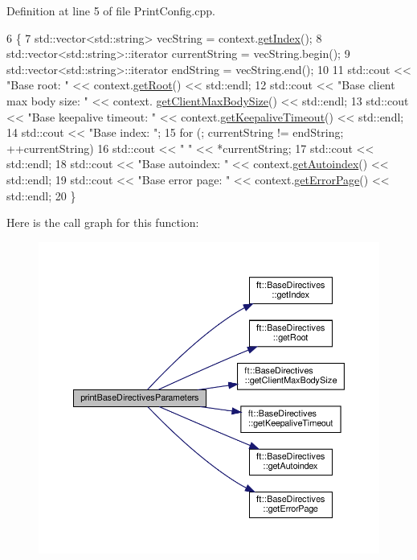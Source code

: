 Definition at line 5 of file Print\+Config.\+cpp.


\begin{DoxyCode}
6     \{
7         std::vector<std::string>        vecString = context.\hyperlink{classft_1_1_base_directives_a018f34a5ffd66e891494b5c0ee69177b}{getIndex}();
8         std::vector<std::string>::iterator  currentString = vecString.begin();
9         std::vector<std::string>::iterator      endString = vecString.end();
10 
11         std::cout << \textcolor{stringliteral}{"Base root: "} << context.\hyperlink{classft_1_1_base_directives_aa5dbcb08bda0a0e7e502d2df7cf64287}{getRoot}() << std::endl;
12         std::cout << \textcolor{stringliteral}{"Base client max body size: "} << context.
      \hyperlink{classft_1_1_base_directives_a930398ba1e4b99b2ba01a60dcda0c923}{getClientMaxBodySize}() << std::endl;
13         std::cout << \textcolor{stringliteral}{"Base keepalive timeout: "} << context.\hyperlink{classft_1_1_base_directives_ab8574338758f65325cab5d1c394826c8}{getKeepaliveTimeout}() << 
      std::endl;
14         std::cout << \textcolor{stringliteral}{"Base index: "};
15         \textcolor{keywordflow}{for} (; currentString != endString; ++currentString)
16             std::cout << \textcolor{stringliteral}{" "} << *currentString;
17         std::cout << std::endl;
18         std::cout << \textcolor{stringliteral}{"Base autoindex: "} << context.\hyperlink{classft_1_1_base_directives_a4c11ed7ad76aeac228b029a2444de568}{getAutoindex}() << std::endl;
19         std::cout << \textcolor{stringliteral}{"Base error page: "} << context.\hyperlink{classft_1_1_base_directives_a3cb0c21f17781de392d5ee09d7190caf}{getErrorPage}() << std::endl;
20     \}
\end{DoxyCode}
Here is the call graph for this function\+:
\nopagebreak
\begin{figure}[H]
\begin{center}
\leavevmode
\includegraphics[width=350pt]{classft_1_1_print_config_ad71821d54e46c04a81d26dbabd3c4b20_cgraph}
\end{center}
\end{figure}
